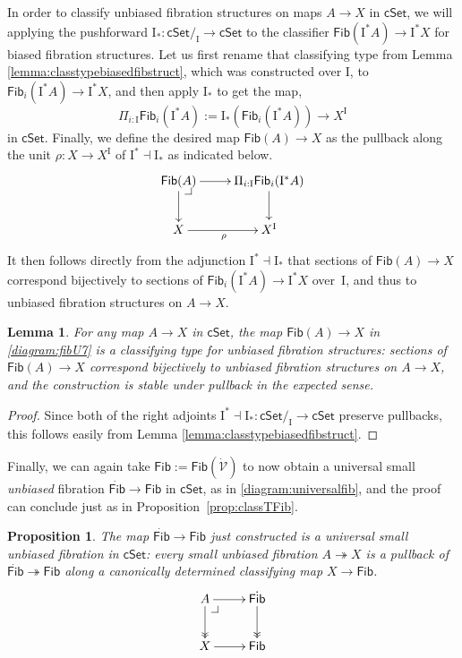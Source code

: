 \documentclass[12pt]{article}
\makeatletter
\newcommand{\cSet}{\ensuremath{\mathsf{cSet}}}
\newcommand{\ra}{\ensuremath{\rightarrow}}
\newcommand{\fib}{\ensuremath{\twoheadrightarrow}}
\renewcommand{\to}{\ensuremath{\rightarrow}}
\newcommand{\too}{\ensuremath{\longrightarrow}}
\newcommand{\I}{\ensuremath{\mathrm{I}}}
\newcommand{\VV}{\ensuremath{\dot{\mathcal{V}}}}
\newcommand{\Fib}{\ensuremath{\mathsf{Fib}}}
\newcommand{\FFib}{\ensuremath{\dot{\mathsf{Fib}}}}
\newtheorem{proposition}[theorem]{Proposition}
\newtheorem{lemma}[theorem]{Lemma}
\theoremstyle{remark}
\theoremstyle{definition}
\newcommand{\pbcorner}[1][dr]{\save*!/#1-1.2pc/#1:(-1,1)@^{|-}\restore}
\makeatother
\begin{document}
In order to classify unbiased fibration structures on maps $A\to X$ in $\cSet$, we will applying the pushforward $\I_*: \cSet/_\I \ra \cSet$ to the classifier $\Fib(\I^*A)\ra \I^*X$ for biased fibration structures.  Let us first rename that classifying type from Lemma \ref{lemma:classtypebiasedfibstruct}, which was constructed over $\I$, to $\Fib_i(\I^*A) \ra \I^{*}X$, and then apply $\I_*$ to get the map,
\[
\Pi_{i:\I}\Fib_i(\I^*A) := \I_*(\Fib_i(\I^*A)) \too X^\I
\]
in $\cSet$.  Finally, we define the desired map $\Fib(A)\ra X$ as the pullback along the unit $\rho : X \ra X^\I$ of  $\I^*\dashv \I_*$ as indicated below.
\begin{equation}\label{diagram:fibU7}
\xymatrix{
 \Fib(A) \ar[d] \ar[r] \pbcorner & \ar[d] \Pi_{i:\I}\Fib_i(\I^*A) \\
 X \ar[r]_{\rho} &  X^\I
}
\end{equation}
It then follows directly from the adjunction $\I^*\dashv \I_*$ that sections of $\Fib(A)\ra X$ correspond bijectively to sections of $\Fib_i (\I^*A)\ra \I^{*}X$ over~$\I$, and thus to unbiased fibration structures on $A\to X$.

\begin{lemma}\label{lemma:classtypeunbiasedfibstruct}
For any map $A\ra X$ in $\cSet$, the map $\Fib(A)\ra X$ in \eqref{diagram:fibU7} is a \emph{classifying type for unbiased fibration structures}: sections of $\Fib(A)\ra X$ correspond bijectively to unbiased fibration structures on $A\ra X$, and the construction is stable under pullback in the expected sense.
\end{lemma}

\begin{proof} Since both of the right adjoints $\I^* \dashv \I_* : \cSet/_\I \ra\cSet$ preserve pullbacks, this follows easily from Lemma \ref{lemma:classtypebiasedfibstruct}.
\end{proof}

Finally, we can again take $\Fib := \Fib(\VV)$ to now obtain a universal small \emph{unbiased} fibration $\FFib\ra\Fib$ in $\cSet$, as in \eqref{diagram:universalfib}, and the proof can conclude just as in Proposition~\ref{prop:classTFib}.  

\begin{proposition}\label{prop:UniversalunbiasedFib}
The map $\FFib\ra\Fib$ just constructed is a \emph{universal small unbiased fibration} in $\cSet$: every small unbiased fibration $A \fib X$ is a pullback of $\FFib \fib \Fib$ along a canonically determined classifying map $X\ra \Fib$.
\begin{equation}\label{diagram:classifyfib}
\xymatrix{
A \ar@{>>}[d] \ar[r]  \pbcorner & \FFib \ar@{>>}[d] \\
X \ar[r] & \Fib
}
\end{equation}
\end{proposition}
\end{document}
